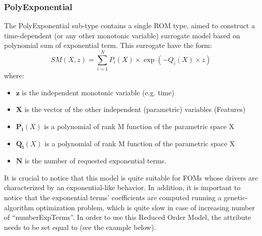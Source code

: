 \subsubsection{PolyExponential}
\label{subsubsec:polyexponential}
The PolyExponential sub-type contains a single ROM type, aimed to construct a time-dependent (or any other monotonic
variable) surrogate model based on polynomial sum of exponential term. This surrogate have the form:
%
\begin{equation}
  SM(X,z) = \sum_{i=1}^{N} P_{i}(X) \times \exp ( - Q_{i}(X) \times z )
\end{equation}
where:
\begin{itemize}
  \item $\mathbf{z}$ is the independent  monotonic variable (e.g. time)
  \item $\mathbf{X}$  is the vector of the other independent (parametric) variables  (Features)
  \item $\mathbf{P_{i}}(X)$ is a polynomial of rank M function of the parametric space X
  \item  $\mathbf{Q_{i}}(X)$ is a polynomial of rank M function of the parametric space X
  \item  $\mathbf{N}$ is the number of requested exponential terms.
\end{itemize}
It is crucial to notice that this model is quite suitable for FOMs whose drivers are characterized by an exponential-like behavior.
In addition, it is important to notice that the exponential terms' coefficients are computed running a genetic-algorithm optimization
problem, which is quite slow in case of increasing number of ``numberExpTerms''.
%
In order to use this Reduced Order Model, the  attribute
 needs to be set equal to  (see the example
below).
%
\subnodeIntro

